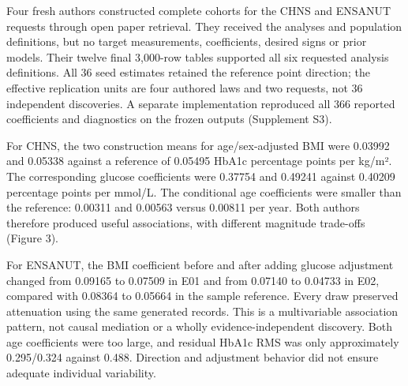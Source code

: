 \documentclass[11pt,letterpaper]{article}
\begin{document}
Four fresh authors constructed complete cohorts for the CHNS and ENSANUT requests through open paper retrieval. They received the analyses and population definitions, but no target measurements, coefficients, desired signs or prior models. Their twelve final 3,000-row tables supported all six requested analysis definitions. All 36 seed estimates retained the reference point direction; the effective replication units are four authored laws and two requests, not 36 independent discoveries. A separate implementation reproduced all 366 reported coefficients and diagnostics on the frozen outputs (Supplement S3).


For CHNS, the two construction means for age/\allowbreak{}sex-adjusted BMI were 0.03992 and 0.05338 against a reference of 0.05495 HbA1c percentage points per kg/\allowbreak{}m². The corresponding glucose coefficients were 0.37754 and 0.49241 against 0.40209 percentage points per mmol/\allowbreak{}L. The conditional age coefficients were smaller than the reference: 0.00311 and 0.00563 versus 0.00811 per year. Both authors therefore produced useful associations, with different magnitude trade-offs (Figure 3).


For ENSANUT, the BMI coefficient before and after adding glucose adjustment changed from 0.09165 to 0.07509 in E01 and from 0.07140 to 0.04733 in E02, compared with 0.08364 to 0.05664 in the sample reference. Every draw preserved attenuation using the same generated records. This is a multivariable association pattern, not causal mediation or a wholly evidence-independent discovery. Both age coefficients were too large, and residual HbA1c RMS was only approximately 0.295/\allowbreak{}0.324 against 0.488. Direction and adjustment behavior did not ensure adequate individual variability.
\end{document}
